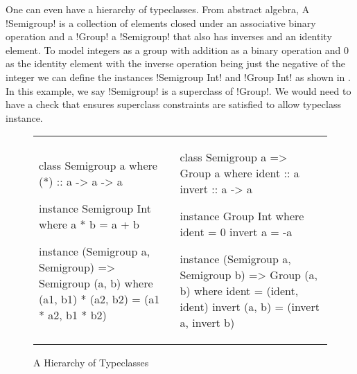 \documentclass[format=sigplan,manuscript,review,screen,nonacm,margin=1in]{acmart}
\begin{document}
One can even have a hierarchy of typeclasses. From abstract algebra, A !Semigroup! is a collection of
elements closed under an associative binary operation and a !Group! a !Semigroup!
that also has inverses and an identity element. To model integers
as a group with addition as a binary operation and $0$ as the identity element with the inverse operation
being just the negative of the integer we can define the instances !Semigroup Int! and !Group Int!
as shown in . In this example, we say !Semigroup! is a superclass of !Group!.
We would need to have a check that ensures superclass constraints are satisfied to allow typeclass instance.
\begin{figure}[ht]
  \begin{tabular}{l l}
    \begin{code}
      class Semigroup a where
          (*) :: a -> a -> a

      instance Semigroup Int where
          a * b = a + b

      instance (Semigroup a, Semigroup)
          => Semigroup (a, b) where
          (a1, b1) * (a2, b2) = (a1 * a2, b1 * b2)
    \end{code}&%
    \begin{code}
      class Semigroup a => Group a where
          ident  :: a
          invert :: a -> a
      
      instance Group Int where
          ident   = 0
          invert a = -a 

      instance (Semigroup a, Semigroup b)
          => Group (a, b) where
          ident  = (ident, ident)
          invert (a, b) = (invert a, invert b)
    \end{code}
  \end{tabular}
  \caption{A Hierarchy of Typeclasses}
  \label{fig:type-class-hierarchy}
\end{figure}
\end{document}

